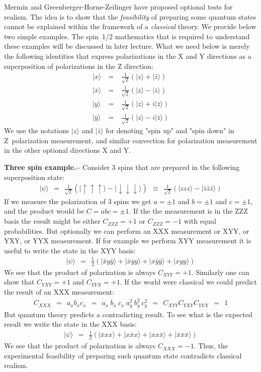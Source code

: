\documentclass[onecolumn,fleqn]{revtex4}
\newcommand{\beq}{\begin{eqnarray}}
\newcommand{\eeq}{\end{eqnarray}}
\begin{document}
Mermin and Greenberger-Horne-Zeilinger have proposed optional tests for realism.
The idea is to show that the {\em feasibility} of preparing some quantum states 
cannot be explained within the framework of a {\em classical} theory.
We provide below two simple examples. The spin~1/2 mathematics that is required 
to understand these examples will be discussed in later lecture. What we need 
below is merely the following identities that express polarizations 
in the X and Y directions as a superposition of polarizations in the Z direction:
\beq
| x \rangle \ &=& \ \frac{1}{\sqrt{2}}\left(| z \rangle + | \bar{z}\rangle\right) \\
| \bar{x} \rangle \ &=& \ \frac{1}{\sqrt{2}}\left(| z \rangle - | \bar{z}\rangle\right) \\
| y \rangle \ &=& \ \frac{1}{\sqrt{2}}\left(| z \rangle +i | \bar{z}\rangle\right) \\
| \bar{y} \rangle \ &=& \ \frac{1}{\sqrt{2}}\left(| z \rangle -i | \bar{z}\rangle\right)
\eeq
We use the notations $| z \rangle$ and  $| \bar{z} \rangle$ for denoting "spin up" 
and "spin down" in Z~polarization measurement, and similar convection 
for polarization measurement in the other optional directions X and Y.
 

{\bf Three spin example.-- } 
Consider 3 spins that are prepared in the following superposition state: 
\beq
|\psi\rangle \ \ = \ \ 
\frac{1}{\sqrt{2}}\left(|\uparrow\uparrow\uparrow\rangle - |\downarrow\downarrow\downarrow\rangle\right)
\ \ \equiv \ \ 
\frac{1}{\sqrt{2}}\left(| zzz \rangle - | \bar{z}\bar{z}\bar{z}\rangle\right)
\eeq
If we measure the polarization of 3 spins 
we get ${a=\pm1}$ and  ${b=\pm1}$ and ${c=\pm1}$, 
and the product would be ${C=abc=\pm1}$. 
If the the measurement is in the ZZZ basis 
the result might be either ${C_{ZZZ}=+1}$ or ${C_{ZZZ}=-1}$ 
with equal probabilities. 
But optionally we can perform an XXX measurement or XYY, 
or YXY, or YYX measurement. If for example we perform XYY measurement 
it is useful to write the state in the XYY basis:
\beq
|\psi\rangle \ \ = \ \ \frac{1}{2}\left(| \bar{x} y \bar{y} \rangle + | \bar{x} \bar{y} y \rangle + | x \bar{y} \bar{y} \rangle + | x y y \rangle\right)
\eeq 
We see that the product of polarization is always $C_{XYY}=+1$. 
Similarly one can show that $C_{YXY}=+1$ and $C_{YYX}=+1$.
If the world were classical we could predict the result 
of an XXX measurement:
\beq
C_{XXX} \ \ = \ \ a_xb_xc_x \ \ = \ \  a_x \ b_x \ c_x \ a_y^2 \ b_y^2 \ c_y^2 \ \ = \ \ C_{XYY}C_{YXY} C_{YYX} \ \ = \ \ 1
\eeq
But quantum theory predicts a contradicting result. 
To see what is the expected result we write the state in the XXX basis:  
\beq
|\psi\rangle \ \ = \ \ \frac{1}{2}\left(| \bar{x} x x \rangle + | x \bar{x} x \rangle + | x x \bar{x} \rangle + | \bar{x} \bar{x} \bar{x} \rangle\right)
\eeq 
We see that the product of polarization is always $C_{XXX}=-1$. 
Thus, the experimental feasibility of preparing such quantum state 
contradicts classical realism. 
     
\end{document}
